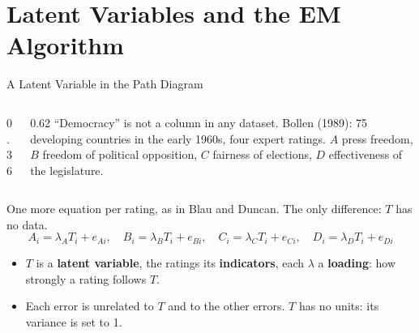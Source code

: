 \documentclass[aspectratio=169,11pt,xcolor=dvipsnames]{beamer}
\begin{document}
\section[Latent Classes]{Latent Variables and the EM Algorithm}
\begin{frame}\sectionpage\end{frame}

\begin{frame}{A Latent Variable in the Path Diagram}
\begin{columns}[c]
\begin{column}{0.36\linewidth}
\centering
{}
\end{column}
\begin{column}{0.62\linewidth}
``Democracy'' is not a column in any dataset. Bollen (1989): 75 developing countries in the
early 1960s, four expert ratings.
$A$ press freedom, $B$ freedom of political opposition, $C$ fairness of elections, $D$
effectiveness of the legislature.
\end{column}
\end{columns}
\vskip2pt
One more equation per rating, as in Blau and Duncan. The only difference: $T$ has no data.
\vskip-4pt
\[ A_i = \lambda_A T_i + e_{Ai}, \quad B_i = \lambda_B T_i + e_{Bi}, \quad
   C_i = \lambda_C T_i + e_{Ci}, \quad D_i = \lambda_D T_i + e_{Di} \]
\vskip-4pt
\begin{itemize}\itemsep3pt
  \item $T$ is a \textbf{latent variable}, the ratings its \textbf{indicators}, each $\lambda$ a
        \textbf{loading}: how strongly a rating follows $T$.
  \item Each error is unrelated to $T$ and to the other errors. $T$ has no units: its
        variance is set to 1.
\end{itemize}
\end{frame}
\end{document}
